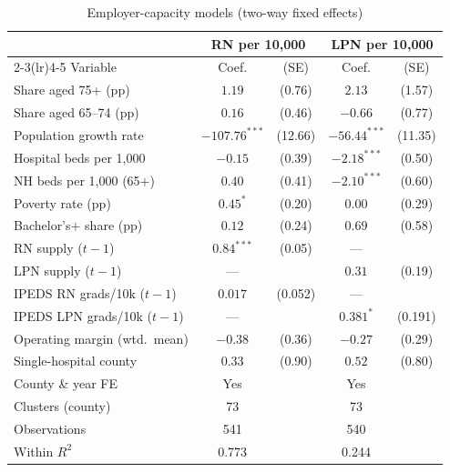 \begin{table}[!htbp]
\centering
\caption{Employer-capacity models (two-way fixed effects)}
\label{tab:employer}
\small
\begin{tabular}{lcccc}
\toprule
 & \multicolumn{2}{c}{RN per 10{,}000} & \multicolumn{2}{c}{LPN per 10{,}000} \\
\cmidrule(lr){2-3}\cmidrule(lr){4-5}
Variable & Coef. & (SE) & Coef. & (SE) \\
\midrule
Share aged 75$+$ (pp) & $1.19$ & (0.76) & $2.13$ & (1.57) \\
Share aged 65--74 (pp) & $0.16$ & (0.46) & $-0.66$ & (0.77) \\
Population growth rate & $-107.76^{***}$ & (12.66) & $-56.44^{***}$ & (11.35) \\
Hospital beds per 1{,}000 & $-0.15$ & (0.39) & $-2.18^{***}$ & (0.50) \\
NH beds per 1{,}000 (65$+$) & $0.40$ & (0.41) & $-2.10^{***}$ & (0.60) \\
Poverty rate (pp) & $0.45^{*}$ & (0.20) & $0.00$ & (0.29) \\
Bachelor's$+$ share (pp) & $0.12$ & (0.24) & $0.69$ & (0.58) \\
RN supply ($t-1$) & $0.84^{***}$ & (0.05) & --- &  \\
LPN supply ($t-1$) & --- &  & $0.31$ & (0.19) \\
IPEDS RN grads/10k ($t-1$) & $0.017$ & (0.052) & --- &  \\
IPEDS LPN grads/10k ($t-1$) & --- &  & $0.381^{*}$ & (0.191) \\
Operating margin (wtd.\ mean) & $-0.38$ & (0.36) & $-0.27$ & (0.29) \\
Single-hospital county & $0.33$ & (0.90) & $0.52$ & (0.80) \\
\midrule
County \& year FE & Yes & & Yes & \\
Clusters (county) & 73 & & 73 & \\
Observations & 541 & & 540 & \\
Within $R^{2}$ & 0.773 & & 0.244 & \\
\bottomrule
\end{tabular}
\end{table}


